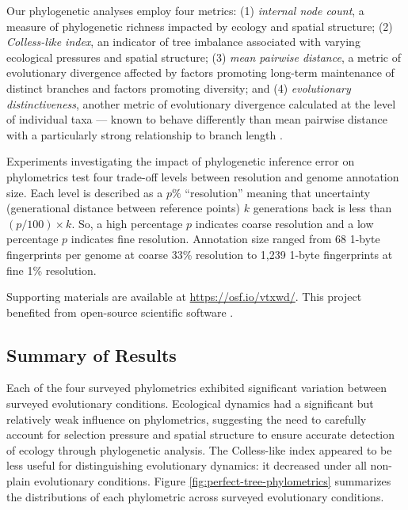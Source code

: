 Our phylogenetic analyses employ four metrics: (1) \textit{internal node count}, a measure of phylogenetic richness impacted by ecology and spatial structure; (2) \textit{Colless-like index}, an indicator of tree imbalance associated with varying ecological pressures and spatial structure; (3) \textit{mean pairwise distance}, a metric of evolutionary divergence affected by factors promoting long-term maintenance of distinct branches and factors promoting diversity; and (4) \textit{evolutionary distinctiveness}, another metric of evolutionary divergence calculated at the level of individual taxa --- known to behave differently than mean pairwise distance with a particularly strong relationship to branch length \citep{tuckerGuidePhylogeneticMetrics2017}.

Experiments investigating the impact of phylogenetic inference error on phylometrics test four trade-off levels between resolution and genome annotation size.
Each level is described as a $p\%$ ``resolution'' meaning that uncertainty (generational distance between reference points) $k$ generations back is less than $(p / 100) \times k$.
So, a high percentage $p$ indicates coarse resolution and a low percentage $p$ indicates fine resolution.
Annotation size ranged from 68 1-byte fingerprints per genome at coarse 33\% resolution to 1,239 1-byte fingerprints at fine 1\% resolution.

Supporting materials are available at \url{https://osf.io/vtxwd/}.
This project benefited from open-source scientific software \citep{ofria2020empirical,moreno2022hstrat,lalejini2019data,sukumaran2010dendropy}.

\vspace{-1.5ex}
\subsection{Summary of Results}

Each of the four surveyed phylometrics exhibited significant variation between surveyed evolutionary conditions.
Ecological dynamics had a significant but relatively weak influence on phylometrics, suggesting the need to carefully account for selection pressure and spatial structure to ensure accurate detection of ecology through phylogenetic analysis.
The Colless-like index appeared to be less useful for distinguishing evolutionary dynamics: it decreased under all non-plain evolutionary conditions.
Figure \ref{fig:perfect-tree-phylometrics} summarizes the distributions of each phylometric across surveyed evolutionary conditions.

